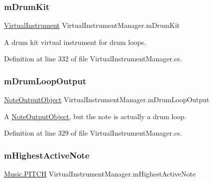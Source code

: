 \subsubsection{\texorpdfstring{m\+Drum\+Kit}{mDrumKit}}
{\footnotesize\ttfamily \hyperlink{class_virtual_instrument}{Virtual\+Instrument} Virtual\+Instrument\+Manager.\+m\+Drum\+Kit\hspace{0.3cm}{\ttfamily [private]}}



A drum kit virtual instrument for drum loops. 



Definition at line 332 of file Virtual\+Instrument\+Manager.\+cs.

\mbox{\label{group___v_i_m_priv_ga5f71cb71d240042312dcc13b481b068d}} 
\subsubsection{\texorpdfstring{m\+Drum\+Loop\+Output}{mDrumLoopOutput}}
{\footnotesize\ttfamily \hyperlink{class_note_output_object}{Note\+Output\+Object} Virtual\+Instrument\+Manager.\+m\+Drum\+Loop\+Output\hspace{0.3cm}{\ttfamily [private]}}



A \hyperlink{class_note_output_object}{Note\+Output\+Object}, but the note is actually a drum loop. 



Definition at line 329 of file Virtual\+Instrument\+Manager.\+cs.

\mbox{\label{group___v_i_m_priv_ga73a09a4e4f09c0e5b3871dc9ad6c757e}} 
\subsubsection{\texorpdfstring{m\+Highest\+Active\+Note}{mHighestActiveNote}}
{\footnotesize\ttfamily \hyperlink{group___music_enums_ga508f69b199ea518f935486c990edac1d}{Music.\+P\+I\+T\+CH} Virtual\+Instrument\+Manager.\+m\+Highest\+Active\+Note\hspace{0.3cm}{\ttfamily [private]}}



